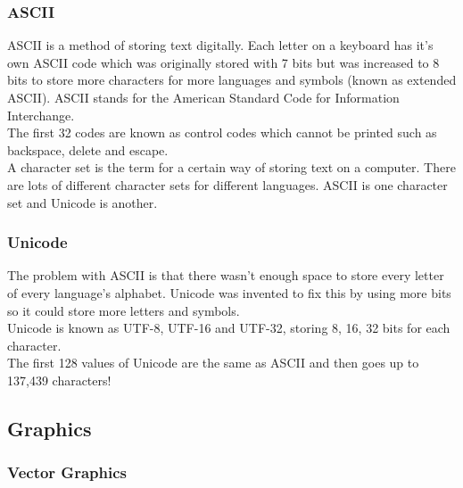 \documentclass[a4paper, 12pt]{report}
\begin{document}
\subsubsection{ASCII}

ASCII is a method of storing text digitally.  Each letter on a keyboard has it's own ASCII code which was originally stored with 7 bits but was increased to 8 bits to store more characters for more languages and symbols (known as extended ASCII).  ASCII stands for the American Standard Code for Information Interchange. \\

The first 32 codes are known as control codes which cannot be printed such as backspace, delete and escape. \\

A character set is the term for a certain way of storing text on a computer.  There are lots of different character sets for different languages.  ASCII is one character set and Unicode is another.

\subsubsection{Unicode}

The problem with ASCII is that there wasn't enough space to store every letter of every language's alphabet.  Unicode was invented to fix this by using more bits so it could store more letters and symbols. \\

Unicode is known as UTF-8, UTF-16 and UTF-32, storing 8, 16, 32 bits for each character. \\

The first 128 values of Unicode are the same as ASCII and then goes up to 137,439 characters!

\subsection{Graphics}

\subsubsection{Vector Graphics}
\end{document}
